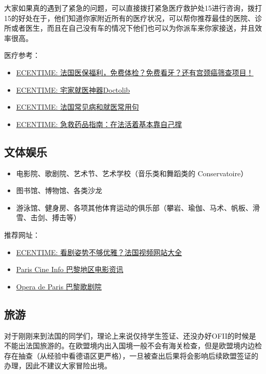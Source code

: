 \documentclass[UTF8]{ctexart}
\begin{document}
大家如果真的遇到了紧急的问题，可以直接拨打紧急医疗救护处15进行咨询，拨打15的好处在于，他们知道你家附近所有的医疗状况，可以帮你推荐最佳的医院、诊所或者医生，而且在自己没有车的情况下他们也可以为你派车来你家接送，并且效率很高。

医疗参考：
\begin{itemize}
    \item \href{https://www.ecentime.com/article/ecentime-ameli-gratuit}{ECENTIME: 法国医保福利，免费体检？免费看牙？还有宫颈癌筛查项目！}
    \item \href{https://www.ecentime.com/article/comment-utiliser-doctolib-pendant-le-confinement}{ECENTIME: 宅家就医神器Doctolib}
    \item \href{https://www.dealmoon.fr/guide/1366}{ECENTIME: 法国常见病和就医常用句}
    \item \href{https://www.ecentime.com/article/2018-pharmacie-list}{ECENTIME: 急救药品指南：在法活着基本靠自己撑}
\end{itemize}

\subsection{文体娱乐}
\begin{itemize}
    \item 电影院、歌剧院、艺术节、艺术学校（音乐类和舞蹈类的 Conservatoire）
    \item 图书馆、博物馆、各类沙龙
    \item 游泳馆、健身房、各项其他体育运动的俱乐部（攀岩、瑜伽、马术、帆板、滑雪、击剑、搏击等）
\end{itemize}

推荐网址：
\begin{itemize}
    \item \href{https://www.ecentime.com/article/streaming-website }{ECENTIME: 看剧姿势不够优雅？法国视频网站大全}
    \item \href{https://paris-cine.info/}{Paris Cine Info 巴黎地区电影资讯}
    \item \href{https://www.operadeparis.fr/en}{Opera de Paris 巴黎歌剧院}
\end{itemize}

\subsection{旅游}
对于刚刚来到法国的同学们，理论上来说仅持学生签证、还没办好OFII的时候是不能出法国旅游的。在欧盟境内出入国境一般不会有海关检查，但是欧盟境内边检存在抽查（从经验中看德语区更严格），一旦被查出后果将会影响后续欧盟签证的办理，因此不建议大家冒险出境。
\end{document}
